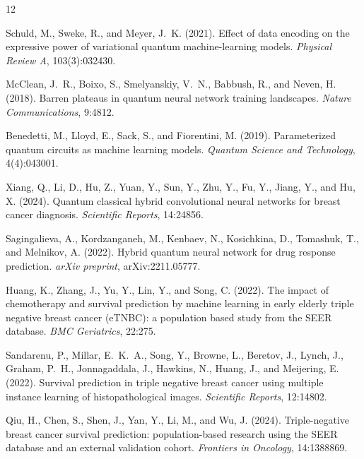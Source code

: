 \documentclass[12pt, letterpaper]{article}
\begin{document}

\begin{thebibliography}{12}

Schuld, M., Sweke, R., and Meyer, J.~K. (2021).
\newblock Effect of data encoding on the expressive power of variational quantum machine-learning models.
\newblock \textit{Physical Review A}, 103(3):032430.

McClean, J.~R., Boixo, S., Smelyanskiy, V.~N., Babbush, R., and Neven, H. (2018).
\newblock Barren plateaus in quantum neural network training landscapes.
\newblock \textit{Nature Communications}, 9:4812.

Benedetti, M., Lloyd, E., Sack, S., and Fiorentini, M. (2019).
\newblock Parameterized quantum circuits as machine learning models.
\newblock \textit{Quantum Science and Technology}, 4(4):043001.

Xiang, Q., Li, D., Hu, Z., Yuan, Y., Sun, Y., Zhu, Y., Fu, Y., Jiang, Y., and Hu, X. (2024).
\newblock Quantum classical hybrid convolutional neural networks for breast cancer diagnosis.
\newblock \textit{Scientific Reports}, 14:24856.

Sagingalieva, A., Kordzanganeh, M., Kenbaev, N., Kosichkina, D., Tomashuk, T., and Melnikov, A. (2022).
\newblock Hybrid quantum neural network for drug response prediction.
\newblock \textit{arXiv preprint}, arXiv:2211.05777.

Huang, K., Zhang, J., Yu, Y., Lin, Y., and Song, C. (2022).
\newblock The impact of chemotherapy and survival prediction by machine learning in early elderly triple negative breast cancer (eTNBC): a population based study from the SEER database.
\newblock \textit{BMC Geriatrics}, 22:275.

Sandarenu, P., Millar, E.~K.~A., Song, Y., Browne, L., Beretov, J., Lynch, J., Graham, P.~H., Jonnagaddala, J., Hawkins, N., Huang, J., and Meijering, E. (2022).
\newblock Survival prediction in triple negative breast cancer using multiple instance learning of histopathological images.
\newblock \textit{Scientific Reports}, 12:14802.

Qiu, H., Chen, S., Shen, J., Yan, Y., Li, M., and Wu, J. (2024).
\newblock Triple-negative breast cancer survival prediction: population-based research using the SEER database and an external validation cohort.
\newblock \textit{Frontiers in Oncology}, 14:1388869.


\end{thebibliography}
\end{document}

